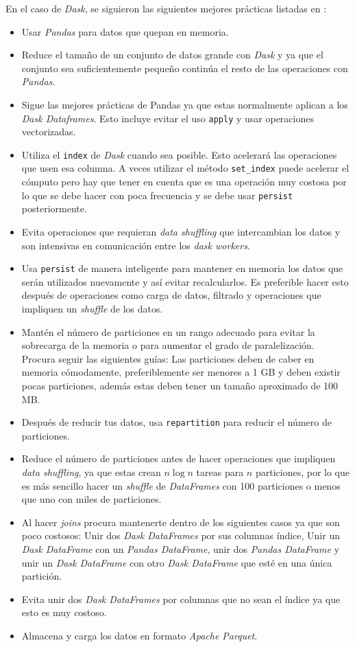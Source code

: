 En el caso de \textit{Dask}, se siguieron las siguientes mejores prácticas listadas en \cite{daskbestpractices}:
\begin{itemize}
	\item Usar \textit{Pandas} para datos que quepan en memoria.
	\item Reduce el tamaño de un conjunto de datos grande con \textit{Dask} y ya que el conjunto sea suficientemente pequeño continúa el resto de las operaciones con \textit{Pandas}.
	\item Sigue las mejores prácticas de Pandas ya que estas normalmente aplican a los \textit{Dask Dataframes}. Esto incluye evitar el uso \texttt{apply} y usar operaciones vectorizadas.
	\item Utiliza el \texttt{index} de \textit{Dask} cuando sea posible. Esto acelerará las operaciones que usen esa columna. A veces utilizar el método \texttt{set\_index} puede acelerar el cómputo pero hay que tener en cuenta que es una operación muy costosa por lo que se debe hacer con poca frecuencia y se debe usar \texttt{persist} posteriormente.
	\item Evita operaciones que requieran \textit{data shuffling} que intercambian los datos y son intensivas en comunicación entre los \textit{dask workers}. 
	\item Usa \texttt{persist} de manera inteligente para mantener en memoria los datos que serán utilizados nuevamente y así evitar recalcularlos. Es preferible hacer esto después de operaciones como carga de datos, filtrado y operaciones que impliquen un \textit{shuffle} de los datos.
	\item Mantén el número de particiones en un rango adecuado para evitar la sobrecarga de la memoria o para aumentar el grado de paralelización. Procura seguir las siguientes guías: Las particiones deben de caber en memoria cómodamente, preferiblemente ser menores a 1 GB y deben existir pocas particiones, además estas deben tener un tamaño aproximado de 100 MB. 
	\item Después de reducir tus datos, usa \texttt{repartition} para reducir el número de particiones.
	\item Reduce el número de particiones antes de hacer operaciones que impliquen \textit{data shuffling}, ya que estas crean $n \log{n}$ tareas para $n$ particiones, por lo que es más sencillo hacer un \textit{shuffle} de \textit{DataFrames} con 100 particiones o menos que uno con miles de particiones.
	\item Al hacer \textit{joins} procura mantenerte dentro de los siguientes casos ya que son poco costosos: Unir dos \textit{Dask DataFrames} por sus columnas índice, Unir un \textit{Dask DataFrame} con un \textit{Pandas DataFrame}, unir dos \textit{Pandas DataFrame} y unir un \textit{Dask DataFrame} con otro \textit{Dask DataFrame} que esté en una única partición. 
	\item Evita unir dos \textit{Dask DataFrames} por columnas que no sean el índice ya que esto es muy costoso.
	\item Almacena y carga los datos en formato \textit{Apache Parquet}.
\end{itemize}

